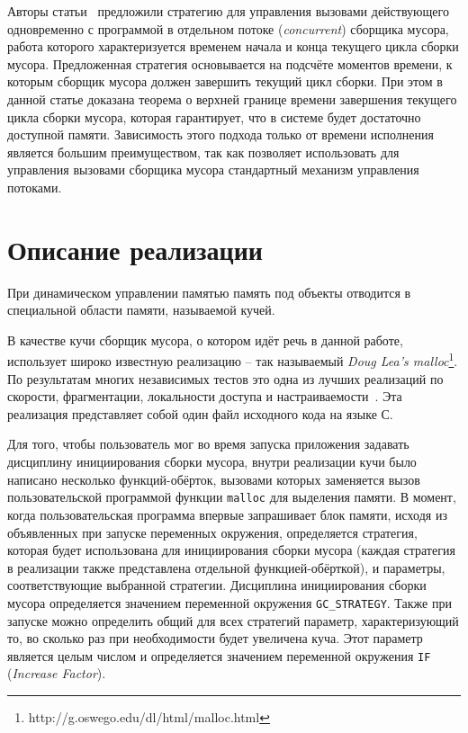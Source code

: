 Авторы статьи~\cite{time-triggered} предложили стратегию для управления
вызовами действующего одновременно с программой в отдельном потоке
(\emph{concurrent}) сборщика мусора,
работа которого характеризуется временем начала и конца текущего цикла сборки мусора.
Предложенная стратегия основывается на подсчёте моментов времени, к которым
сборщик мусора должен завершить текущий цикл сборки. При этом в данной статье 
доказана теорема о верхней границе времени завершения текущего цикла сборки мусора,
которая гарантирует, что в системе будет достаточно доступной памяти. Зависимость этого
подхода только от времени исполнения является большим преимуществом, так как позволяет
использовать для управления вызовами сборщика мусора стандартный механизм управления
потоками. 

\section{Описание реализации}

При динамическом управлении памятью память под объекты отводится в специальной 
области памяти, называемой кучей. 

В качестве кучи сборщик мусора, о котором идёт речь в данной работе, использует
широко известную реализацию -- так называемый 
\emph{Doug Lea's malloc}\footnote{http://g.oswego.edu/dl/html/malloc.html}.
По результатам
многих независимых тестов это одна из лучших реализаций 
по скорости, фрагментации, локальности доступа и настраиваемости~\cite{Zorn}. 
Эта реализация представляет собой один файл исходного кода на языке С. 

Для того, чтобы пользователь мог во время запуска приложения задавать дисциплину 
инициирования
сборки мусора, внутри реализации кучи было написано несколько функций-обёрток, 
вызовами которых 
заменяется вызов пользовательской программой функции \texttt{malloc} для выделения памяти. 
В момент, когда
пользовательская программа впервые запрашивает блок памяти, исходя из объявленных
при запуске переменных окружения, определяется стратегия, которая будет использована 
для инициирования сборки мусора (каждая стратегия в реализации также представлена 
отдельной функцией-обёрткой), и параметры, соответствующие выбранной стратегии. 
Дисциплина инициирования сборки 
мусора определяется значением переменной окружения \texttt{GC\_STRATEGY}. Также при запуске 
можно определить общий для всех стратегий параметр, характеризующий то, во сколько раз
при необходимости будет увеличена куча. Этот параметр является целым числом
и определяется значением переменной окружения \texttt{IF}
(\emph{Increase Factor}). 

